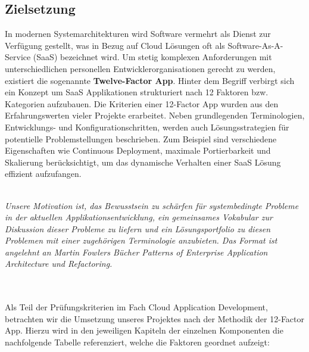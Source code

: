 \subsection{Zielsetzung}
In modernen Systemarchitekturen wird Software vermehrt als Dienst zur Verfügung gestellt, was in Bezug auf Cloud Lösungen oft als Software-As-A-Service (SaaS) bezeichnet wird.  Um stetig komplexen Anforderungen mit unterschiedlichen personellen Entwicklerorganisationen  gerecht zu werden, existiert die sogenannte \textbf{Twelve-Factor App}. Hinter dem Begriff verbirgt sich ein Konzept um SaaS Applikationen strukturiert nach 12 Faktoren bzw. Kategorien aufzubauen. Die Kriterien einer 12-Factor App wurden aus den Erfahrungswerten vieler Projekte erarbeitet. Neben grundlegenden Terminologien, Entwicklungs- und Konfigurationschritten, werden auch Lösungsstrategien für potentielle Problemstellungen beschrieben. Zum Beispiel sind verschiedene Eigenschaften wie Continuous Deployment, maximale Portierbarkeit und Skalierung berücksichtigt, um das dynamische Verhalten einer SaaS Lösung effizient aufzufangen.\\ \\
\begin{itshape}
\emph{Unsere Motivation ist, das Bewusstsein zu schärfen für systembedingte Probleme in der aktuellen Applikationsentwicklung, ein gemeinsames Vokabular zur Diskussion dieser Probleme zu liefern und ein Lösungsportfolio zu diesen Problemen mit einer zugehörigen Terminologie anzubieten. Das Format ist angelehnt an Martin Fowlers Bücher Patterns of Enterprise Application Architecture und Refactoring.}
\end{itshape}\cite{12:fac}
\\ \\
Als Teil der Prüfungskriterien im Fach Cloud Application Development, betrachten wir die Umsetzung unseres Projektes nach der Methodik der 12-Factor App. Hierzu wird in den jeweiligen Kapiteln der einzelnen Komponenten die nachfolgende Tabelle referenziert, welche die Faktoren geordnet aufzeigt:

